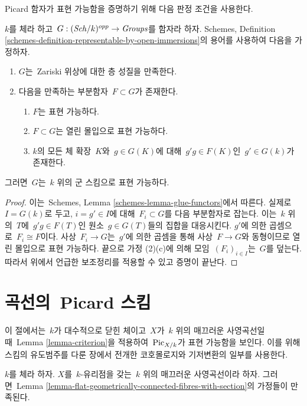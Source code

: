 \noindent
Picard 함자가 표현 가능함을 증명하기 위해 다음 판정 조건을 사용한다.

\begin{lemma}
\label{lemma-criterion}
$k$를 체라 하고\  $G : (\mathit{Sch}/k)^{opp} \to \textit{Groups}$를 함자라 하자.
Schemes, Definition
\ref{schemes-definition-representable-by-open-immersions}의 용어를 사용하여
다음을 가정하자.
\begin{enumerate}
\item $G$는\  Zariski 위상에 대한 층 성질을 만족한다.
\item 다음을 만족하는 부분함자\  $F \subset G$가 존재한다.
\begin{enumerate}
\item $F$는 표현 가능하다.
\item $F \subset G$는 열린 몰입으로 표현 가능하다.
\item $k$의 모든 체 확장\  $K$와\  $g \in G(K)$에 대해\ 
$g'g \in F(K)$인\  $g' \in G(k)$가 존재한다.
\end{enumerate}
\end{enumerate}
그러면\  $G$는\  $k$ 위의 군 스킴으로 표현 가능하다.
\end{lemma}

\begin{proof}
이는\  Schemes, Lemma \ref{schemes-lemma-glue-functors}에서 따른다.
실제로\  $I = G(k)$로 두고, $i = g' \in I$에 대해\  $F_i \subset G$를 다음
부분함자로 잡는다. 이는\  $k$ 위의\  $T$에\  $g'g \in F(T)$인 원소\ 
$g \in G(T)$들의 집합을 대응시킨다. $g'$에 의한 곱셈으로\ 
$F_i \cong F$이다. 사상\  $F_i \to G$는\  $g'$에 의한 곱셈을 통해 사상\ 
$F \to G$와 동형이므로 열린 몰입으로 표현 가능하다. 끝으로 가정
(2)(c)에 의해 모임\  $(F_i)_{i \in I}$는\  $G$를 덮는다. 따라서 위에서
언급한 보조정리를 적용할 수 있고 증명이 끝난다.
\end{proof}



\section{곡선의\  Picard 스킴}
\label{section-picard-curve}

\noindent
이 절에서는\  $k$가 대수적으로 닫힌 체이고\  $X$가\  $k$ 위의 매끄러운
사영곡선일 때\  Lemma \ref{lemma-criterion}을 적용하여\ 
$\mathrm{Pic}_{X/k}$가 표현 가능함을 보인다. 이를 위해 스킴의 유도범주를
다룬 장에서 전개한 코호몰로지와 기저변환의 일부를 사용한다.

\begin{lemma}
\label{lemma-check-conditions}
$k$를 체라 하자. $X$를\  $k$-유리점을 갖는\  $k$ 위의 매끄러운 사영곡선이라
하자. 그러면\  Lemma
\ref{lemma-flat-geometrically-connected-fibres-with-section}의 가정들이
만족된다.
\end{lemma}

